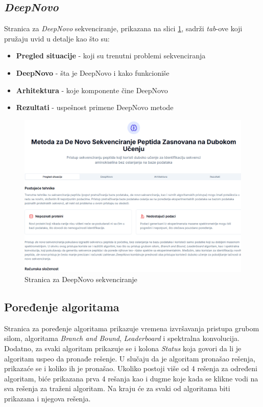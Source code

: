 \documentclass[12pt,oneside]{memoir}
\begin{document}
\subsection{\emph{DeepNovo}}
Stranica za \emph{DeepNovo} sekvenciranje, prikazana na slici \ref{fig:deepnovo_1}, sadrži \emph{tab}-ove koji pružaju uvid u detalje kao što su:
\begin{itemize}
    \item \textbf{Pregled situacije} - koji su trenutni problemi sekvenciranja
    \item \textbf{DeepNovo} - šta je DeepNovo i kako funkcioniše
    \item \textbf{Arhitektura} - koje komponente čine DeepNovo
    \item \textbf{Rezultati} - uspešnost primene DeepNovo metode
\end{itemize}

\begin{figure}[H]
\centering
\includegraphics[width=1\textwidth]{images/deepnovo_1.png}
\caption{Stranica za DeepNovo sekvenciranje}
\label{fig:deepnovo_1}
\end{figure}

\subsection{Poređenje algoritama}

Stranica za poređenje algoritama prikazuje vremena izvršavanja pristupa grubom silom, algoritama \emph{Branch and Bound}, \emph{Leaderboard} i spektralna konvolucija. Dodatno, za svaki algoritam prikazuje se i kolona \textit{Status} koja govori da li je algoritam uspeo da pronađe rešenje. U slučaju da je algoritam pronašao rešenja, prikazaće se i koliko ih je pronašao. Ukoliko postoji više od 4 rešenja za određeni algoritam, biće prikazana prva 4 rešanja kao i dugme koje kada se klikne vodi na sva rešenja za traženi algoritam. Na kraju će za svaki od algoritama biti prikazana i njegova rešenja. 
\end{document}
